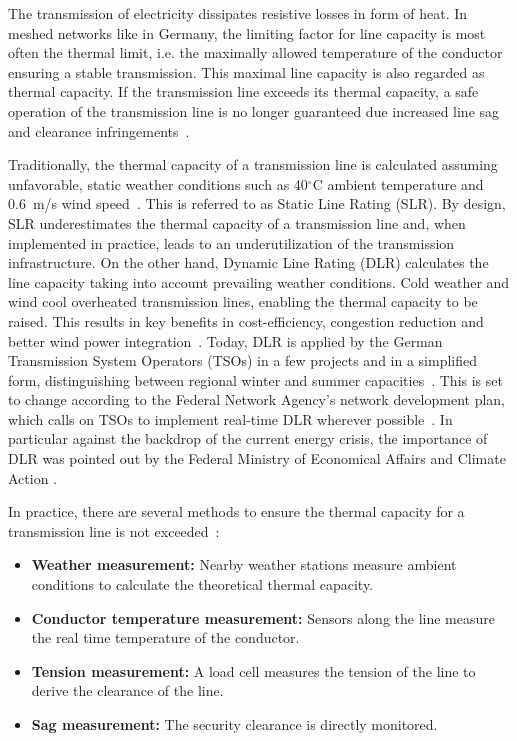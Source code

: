 \documentclass[preprint,12pt]{elsarticle}
\begin{document}
The transmission of electricity dissipates resistive losses in form of heat. In meshed networks like in Germany, the limiting factor for line capacity is most often the thermal limit, i.e. the maximally allowed temperature of the conductor ensuring a stable transmission.
This maximal line capacity is also regarded as thermal capacity.
If the transmission line exceeds its thermal capacity, a safe operation of the transmission line is no longer guaranteed due increased line sag and clearance infringements~\cite{fernandezReviewDynamicLine2016}.

Traditionally, the thermal capacity of a transmission line is calculated assuming unfavorable, static weather conditions such as 40$^\circ$C  ambient temperature and 0.6~m/s wind speed~\cite{fernandezReviewDynamicLine2016}. This is referred to as Static Line Rating (SLR).
By design, SLR underestimates the thermal capacity of a transmission line and, when implemented in practice, leads to an underutilization of the transmission infrastructure. On the other hand, Dynamic Line Rating (DLR) calculates the line capacity taking into account prevailing weather conditions. Cold weather and wind cool overheated transmission lines, enabling the thermal capacity to be raised. This results in key benefits in cost-efficiency, congestion reduction and better wind power integration~\cite{erdincComprehensiveOverviewDynamic2020}.
Today, DLR is applied by the German Transmission System Operators (TSOs) in a few projects and in a simplified form, distinguishing between regional winter and summer capacities~\cite{bundesnetzagenturMonitoringReport20212022}. This is set to change according to the Federal Network Agency's network development plan, which calls on TSOs to implement real-time DLR wherever possible~\cite{bundesnetzagenturMonitoringReport20212022}. In particular against the backdrop of the current energy crisis, the importance of DLR was pointed out by the Federal Ministry of Economical Affairs and Climate Action \cite{federalministryofeconomicaffairsandclimateactionMehrStromIns}.

In practice, there are several methods to ensure the thermal capacity for a transmission line is not exceeded~\cite{albizuMethodsIncreasingRating2005}:
\begin{itemize}
    \item \textbf{Weather measurement:} Nearby weather stations measure ambient conditions to calculate the theoretical thermal capacity.
    \item \textbf{Conductor temperature measurement:} Sensors along the line measure the real time temperature of the conductor.
    \item \textbf{Tension measurement:} A load cell measures the tension of the line to derive the clearance of the line.
    \item \textbf{Sag measurement:} The security clearance is directly monitored.
\end{itemize}
\end{document}
